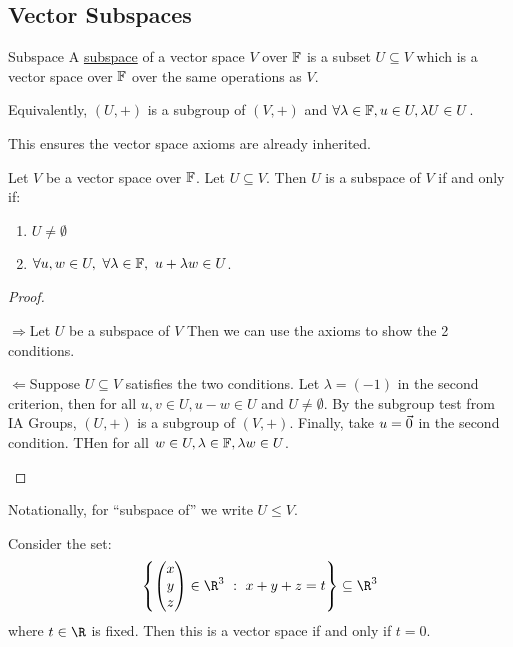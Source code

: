 \documentclass[../Main.tex]{subfiles}
\begin{document}
\subsection{Vector Subspaces}
\begin{definition}{Subspace}
    A \underline{subspace} of a vector space $V$ over $\mathbb{F}$ is a subset $U \subseteq V$ which is a vector space over $\mathbb{F}$ over the same operations as $V$.

    Equivalently, $(U, +)$ is a subgroup of $(V, +)$ and $\forall \lambda \in \mathbb{F}, u \in U, \lambda U \in U$.
\end{definition}
\begin{remark}
    This ensures the vector space axioms are already inherited.
\end{remark}
\begin{proposition}
    Let $V$ be a vector space over $\mathbb{F}$. Let $U \subseteq V$. Then $U$ is a subspace of $V$ if and only if:
    \begin{enumerate}
        \item $U \neq \emptyset$
        \item $\forall u, w \in U,~\forall \lambda \in \mathbb{F},~ u + \lambda w \in U$.
    \end{enumerate}
    \label{propSubspaceTest}
\end{proposition}
\begin{proof}
    \begin{proofdirection}{$\Rightarrow$}{Let $U$ be a subspace of $V$}
        Then we can use the axioms to show the 2 conditions.
    \end{proofdirection}
    \begin{proofdirection}{$\Leftarrow$}{Suppose $U \subseteq V$ satisfies the two conditions.}
        Let $\lambda = (-1)$ in the second criterion, then for all $u, v \in U, u - w \in U$ and $U \neq \emptyset$. By the subgroup test from IA Groups, $(U, +)$ is a subgroup of $(V, +)$. Finally, take $u = \vec{0}$ in the second condition. THen for all $w \in U, \lambda \in \mathbb{F}, \lambda w \in U$.
    \end{proofdirection}
\end{proof}
Notationally, for ``subspace of'' we write $U \leq V$.
\begin{example}
    Consider the set:
    \begin{equation*}
        \left\{\begin{pmatrix} x \\ y \\ z\end{pmatrix} \in \R^3~:~x + y + z = t\right\} \subseteq \R^3
    \end{equation*}
    where $t \in \R$ is fixed. Then this is a vector space if and only if $t = 0$.
\end{example}
\end{document}
